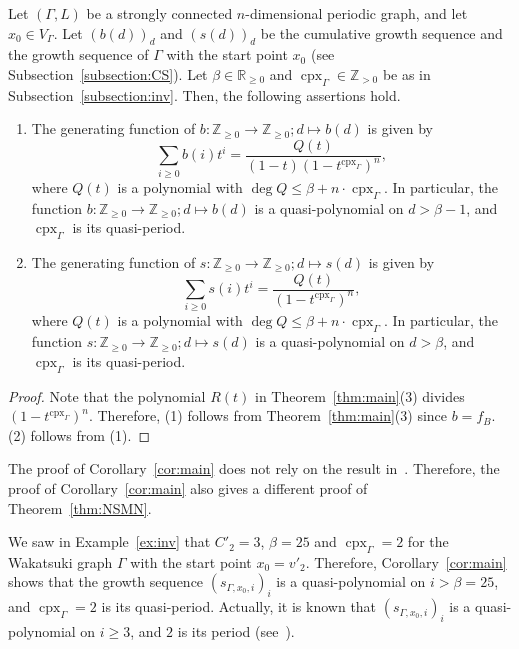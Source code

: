 \begin{cor}\label{cor:main}
Let $(\Gamma , L)$ be a strongly connected $n$-dimensional periodic graph, and let $x_0 \in V_{\Gamma}$. 
Let $(b(d))_d$ and $(s(d))_d$ be the cumulative growth sequence and the growth sequence of $\Gamma$ with the start point $x_0$ 
(see Subsection~\ref{subsection:CS}). 
Let $\beta \in \mathbb{R}_{\ge 0}$ and $\operatorname{cpx}_{\Gamma} \in \mathbb{Z}_{>0}$ be as in Subsection~\ref{subsection:inv}. 
Then, the following assertions hold. 
\begin{enumerate}
\item 
The generating function of $b: \mathbb{Z}_{\ge 0} \to \mathbb{Z}_{\ge 0}; d \mapsto b(d)$ is given by 
\[
\sum _{i \ge 0} b(i) t^i = 
\frac{Q(t)}{(1-t) ( 1 - t^{\operatorname{cpx}_{\Gamma}} )^{n}}, 
\]
where $Q(t)$ is a polynomial with $\deg Q \le \beta + n \cdot \operatorname{cpx}_{\Gamma}$. 
In particular, the function $b: \mathbb{Z}_{\ge 0} \to \mathbb{Z}_{\ge 0}; d \mapsto b(d)$ is a quasi-polynomial on $d > \beta -1$, and 
$\operatorname{cpx}_{\Gamma}$ is its quasi-period. 

\item 
The generating function of $s: \mathbb{Z}_{\ge 0} \to \mathbb{Z}_{\ge 0}; d \mapsto s(d)$ is given by 
\[
\sum _{i \ge 0} s(i) t^i = 
\frac{Q(t)}{(1 - t^{\operatorname{cpx}_{\Gamma}} )^{n}}, 
\]
where $Q(t)$ is a polynomial with $\deg Q \le \beta + n \cdot \operatorname{cpx}_{\Gamma}$. 
In particular, 
the function $s: \mathbb{Z}_{\ge 0} \to \mathbb{Z}_{\ge 0}; d \mapsto s(d)$ is a quasi-polynomial on $d > \beta$, and 
$\operatorname{cpx}_{\Gamma}$ is its quasi-period. 
\end{enumerate}
\end{cor}
\begin{proof}
Note that the polynomial $R(t)$ in Theorem~\ref{thm:main}(3) divides $( 1 - t^{\operatorname{cpx}_{\Gamma}} )^{n}$. 
Therefore, 
(1) follows from Theorem~\ref{thm:main}(3) since $b = f_B$. 
(2) follows from (1). 
\end{proof}


\begin{rmk}\label{rmk:NSMN}
The proof of Corollary~\ref{cor:main} does not rely on the result in~\cite{NSMN21}. 
Therefore, the proof of Corollary~\ref{cor:main} also gives a different proof of Theorem~\ref{thm:NSMN}. 
\end{rmk}

\begin{ex}
We saw in Example~\ref{ex:inv} that $C'_2 = 3$, $\beta = 25$ and $\operatorname{cpx}_{\Gamma} = 2$ 
for the Wakatsuki graph $\Gamma$ with the start point $x_0 = v'_2$. 
Therefore, Corollary~\ref{cor:main} shows that the growth sequence $(s_{\Gamma, x_0, i})_i$  is 
a quasi-polynomial on $i > \beta = 25$, and 
$\operatorname{cpx}_{\Gamma} = 2$ is its quasi-period. 
Actually, it is known that $(s_{\Gamma, x_0, i})_i$ is a quasi-polynomial on $i \ge 3$, and $2$ is its period (see~\cite[Example 2.18]{IN}). 
\end{ex}

